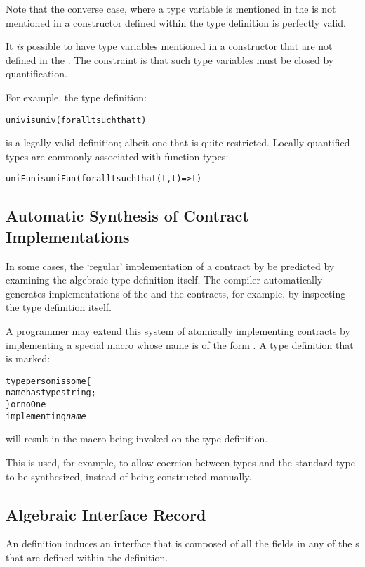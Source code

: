 \begin{aside}
Note that the converse case, where a type variable is mentioned in the  is not mentioned in a constructor defined within the type definition is perfectly valid.
\end{aside}

It \emph{is} possible to have type variables mentioned in a constructor that are not defined in the . The constraint is that such type variables must be closed by quantification.

For example, the type definition:
\begin{alltt}
univ is univ(for all t such that t)
\end{alltt}
is a legally valid  definition; albeit one that is quite restricted. Locally quantified types are commonly associated with function types:
\begin{alltt}
uniFun is uniFun(for all t such that (t,t)=>t)
\end{alltt}

\subsection{Automatic Synthesis of Contract Implementations}

In some cases, the `regular' implementation of a contract by be predicted by examining the algebraic type definition itself. The \Sr compiler automatically generates implementations of the  and the  contracts, for example, by inspecting the type definition itself.

A programmer may extend this system of atomically implementing contracts by implementing a special macro whose name is of the form . A type definition that is marked:
\begin{alltt}
type person is some\{
  name has type string;
\} or noOne 
  implementing \emph{name}
\end{alltt}
will result in the macro  being invoked on the type definition. 

This is used, for example, to allow coercion between types and the standard  type to be synthesized, instead of being constructed manually.

\subsection{Algebraic Interface Record}
\label{algebraicInterface}
An  definition induces an interface that is composed of all the fields in any of the s that are defined within the definition.


